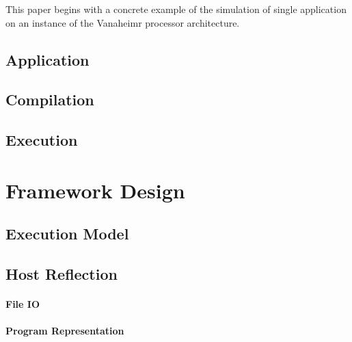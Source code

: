 \documentclass[conference, 10pt]{IEEEtran}
\begin{document}
This paper begins with a concrete example of the simulation of single
application on an instance of the Vanaheimr processor architecture.  

\subsection{Application}




\subsection{Compilation}



% 

\subsection{Execution}


\section{Framework Design}
\label{sec:framework-design}

\subsection{Execution Model}

\subsection{Host Reflection}

\paragraph{File IO}

\paragraph{Program Representation}
\end{document}
